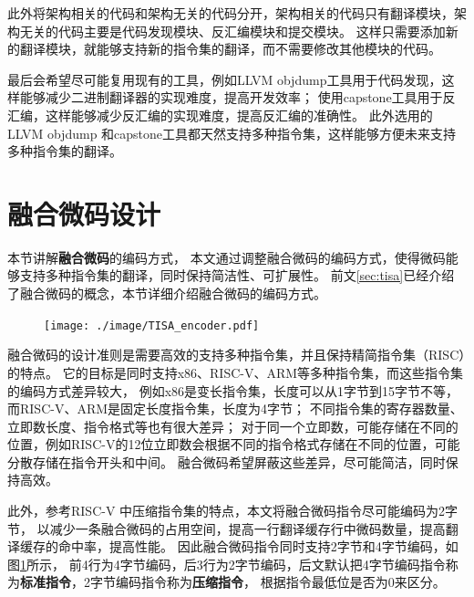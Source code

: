 此外将架构相关的代码和架构无关的代码分开，架构相关的代码只有翻译模块，架构无关的代码主要是代码发现模块、反汇编模块和提交模块。
这样只需要添加新的翻译模块，就能够支持新的指令集的翻译，而不需要修改其他模块的代码。

最后会希望尽可能复用现有的工具，例如LLVM objdump工具用于代码发现，这样能够减少二进制翻译器的实现难度，提高开发效率；
使用capstone工具用于反汇编，这样能够减少反汇编的实现难度，提高反汇编的准确性。
此外选用的LLVM objdump 和capstone工具都天然支持多种指令集，这样能够方便未来支持多种指令集的翻译。




\section{融合微码设计}

本节讲解\textbf{融合微码}的编码方式，
本文通过调整融合微码的编码方式，使得微码能够支持多种指令集的翻译，同时保持简洁性、可扩展性。
前文\ref{sec:tisa}已经介绍了融合微码的概念，本节详细介绍融合微码的编码方式。

\begin{figure}[!htbp]
  \centering
  \texttt{[image: ./image/TISA\_encoder.pdf]}
  \label{img:TISA_encoder}
\end{figure}

融合微码的设计准则是需要高效的支持多种指令集，并且保持精简指令集（RISC）的特点。
它的目标是同时支持x86、RISC-V、ARM等多种指令集，而这些指令集的编码方式差异较大，
例如x86是变长指令集，长度可以从1字节到15字节不等，而RISC-V、ARM是固定长度指令集，长度为4字节；
不同指令集的寄存器数量、立即数长度、指令格式等也有很大差异；
对于同一个立即数，可能存储在不同的位置，例如RISC-V的12位立即数会根据不同的指令格式存储在不同的位置，可能分散存储在指令开头和中间。
融合微码希望屏蔽这些差异，尽可能简洁，同时保持高效。

此外，参考RISC-V 中压缩指令集的特点，本文将融合微码指令尽可能编码为2字节，
以减少一条融合微码的占用空间，提高一行翻译缓存行中微码数量，提高翻译缓存的命中率，提高性能。
因此融合微码指令同时支持2字节和4字节编码，如图\ref{img:TISA_encoder}所示，
前4行为4字节编码，后3行为2字节编码，后文默认把4字节编码指令称为\textbf{标准指令}，2字节编码指令称为\textbf{压缩指令}，
根据指令最低位是否为0来区分。

